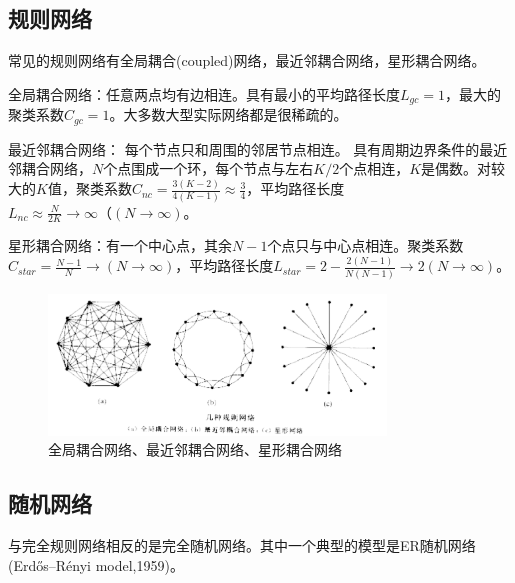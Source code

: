 \documentclass[11pt]{article}
\begin{document}
	\subsection{规则网络}
		常见的规则网络有全局耦合(coupled)网络，最近邻耦合网络，星形耦合网络。\par
		全局耦合网络：任意两点均有边相连。具有最小的平均路径长度$L_{gc}=1$，最大的聚类系数$C_{gc}=1$。大多数大型实际网络都是很稀疏的。\par
		最近邻耦合网络： 每个节点只和周围的邻居节点相连。	具有周期边界条件的最近邻耦合网络，$N$个点围成一个环，每个节点与左右$K/2$个点相连，$K$是偶数。对较大的$K$值，聚类系数$C_{nc}=\frac{3(K-2)}{4(K-1)}\approx\frac{3}{4}$，平均路径长度$L_{nc}\approx \frac{N}{2K} \rightarrow \infty （(N \rightarrow \infty)$。\par
		星形耦合网络：有一个中心点，其余$N-1$个点只与中心点相连。聚类系数$C_{star}=\frac{N-1}{N} \rightarrow (N \rightarrow \infty)$，平均路径长度$L_{star}=2- \frac{2(N-1)}{N(N-1)} \rightarrow 2 (N \rightarrow \infty)$。
		
		\begin{figure}[htbp]
			\centering
			\includegraphics[width=0.8\textwidth]{pic/01-rgraph.png}
			\caption{全局耦合网络、最近邻耦合网络、星形耦合网络}
		\end{figure}
		
	\subsection{随机网络}	
		与完全规则网络相反的是完全随机网络。其中一个典型的模型是ER随机网络(Erdős–Rényi model,1959)。\par
		
\end{document}
